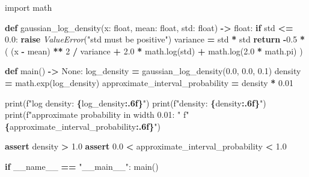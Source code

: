 \documentclass[
  chinese,
  11pt,
  letterpaper,
]{article}
\newenvironment{Shaded}{\begin{snugshade}}{\end{snugshade}}
\newcommand{\BuiltInTok}[1]{#1}
\newcommand{\ControlFlowTok}[1]{\textcolor[rgb]{0.13,0.29,0.53}{\textbf{#1}}}
\newcommand{\DecValTok}[1]{\textcolor[rgb]{0.00,0.00,0.81}{#1}}
\newcommand{\FloatTok}[1]{\textcolor[rgb]{0.00,0.00,0.81}{#1}}
\newcommand{\ImportTok}[1]{#1}
\newcommand{\KeywordTok}[1]{\textcolor[rgb]{0.13,0.29,0.53}{\textbf{#1}}}
\newcommand{\NormalTok}[1]{#1}
\newcommand{\OperatorTok}[1]{\textcolor[rgb]{0.81,0.36,0.00}{\textbf{#1}}}
\newcommand{\PreprocessorTok}[1]{\textcolor[rgb]{0.56,0.35,0.01}{\textit{#1}}}
\newcommand{\SpecialCharTok}[1]{\textcolor[rgb]{0.81,0.36,0.00}{\textbf{#1}}}
\newcommand{\SpecialStringTok}[1]{\textcolor[rgb]{0.31,0.60,0.02}{#1}}
\newcommand{\StringTok}[1]{\textcolor[rgb]{0.31,0.60,0.02}{#1}}
\newcommand{\VariableTok}[1]{\textcolor[rgb]{0.00,0.00,0.00}{#1}}
\renewenvironment{Shaded}{\par\smallskip}{\par\smallskip}
\begin{document}
\begin{Shaded}
\begin{Highlighting}[]
\ImportTok{import}\NormalTok{ math}


\KeywordTok{def}\NormalTok{ gaussian\_log\_density(x: }\BuiltInTok{float}\NormalTok{, mean: }\BuiltInTok{float}\NormalTok{, std: }\BuiltInTok{float}\NormalTok{) }\OperatorTok{{-}\textgreater{}} \BuiltInTok{float}\NormalTok{:}
    \ControlFlowTok{if}\NormalTok{ std }\OperatorTok{\textless{}=} \FloatTok{0.0}\NormalTok{:}
        \ControlFlowTok{raise} \PreprocessorTok{ValueError}\NormalTok{(}\StringTok{"std must be positive"}\NormalTok{)}
\NormalTok{    variance }\OperatorTok{=}\NormalTok{ std }\OperatorTok{*}\NormalTok{ std}
    \ControlFlowTok{return} \OperatorTok{{-}}\FloatTok{0.5} \OperatorTok{*}\NormalTok{ (}
\NormalTok{        (x }\OperatorTok{{-}}\NormalTok{ mean) }\OperatorTok{**} \DecValTok{2} \OperatorTok{/}\NormalTok{ variance}
        \OperatorTok{+} \FloatTok{2.0} \OperatorTok{*}\NormalTok{ math.log(std)}
        \OperatorTok{+}\NormalTok{ math.log(}\FloatTok{2.0} \OperatorTok{*}\NormalTok{ math.pi)}
\NormalTok{    )}


\KeywordTok{def}\NormalTok{ main() }\OperatorTok{{-}\textgreater{}} \VariableTok{None}\NormalTok{:}
\NormalTok{    log\_density }\OperatorTok{=}\NormalTok{ gaussian\_log\_density(}\FloatTok{0.0}\NormalTok{, }\FloatTok{0.0}\NormalTok{, }\FloatTok{0.1}\NormalTok{)}
\NormalTok{    density }\OperatorTok{=}\NormalTok{ math.exp(log\_density)}
\NormalTok{    approximate\_interval\_probability }\OperatorTok{=}\NormalTok{ density }\OperatorTok{*} \FloatTok{0.01}

    \BuiltInTok{print}\NormalTok{(}\SpecialStringTok{f"log density: }\SpecialCharTok{\{}\NormalTok{log\_density}\SpecialCharTok{:.6f\}}\SpecialStringTok{"}\NormalTok{)}
    \BuiltInTok{print}\NormalTok{(}\SpecialStringTok{f"density: }\SpecialCharTok{\{}\NormalTok{density}\SpecialCharTok{:.6f\}}\SpecialStringTok{"}\NormalTok{)}
    \BuiltInTok{print}\NormalTok{(}\SpecialStringTok{f"approximate probability in width 0.01: "}
          \SpecialStringTok{f"}\SpecialCharTok{\{}\NormalTok{approximate\_interval\_probability}\SpecialCharTok{:.6f\}}\SpecialStringTok{"}\NormalTok{)}

    \ControlFlowTok{assert}\NormalTok{ density }\OperatorTok{\textgreater{}} \FloatTok{1.0}
    \ControlFlowTok{assert} \FloatTok{0.0} \OperatorTok{\textless{}}\NormalTok{ approximate\_interval\_probability }\OperatorTok{\textless{}} \FloatTok{1.0}


\ControlFlowTok{if} \VariableTok{\_\_name\_\_} \OperatorTok{==} \StringTok{"\_\_main\_\_"}\NormalTok{:}
\NormalTok{    main()}
\end{Highlighting}
\end{Shaded}
\end{document}
